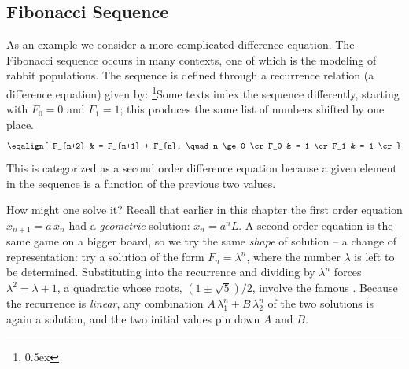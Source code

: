 \subsection{Fibonacci Sequence}
As an example we consider a more complicated difference equation.
The Fibonacci sequence occurs in many contexts, one of which is the modeling of rabbit populations. The
sequence is defined through a recurrence relation (a difference equation) given by:%
\footnote{\kern 0.5pt \raise 0.5ex \hbox{\dag}}{Some texts index the sequence
differently, starting with $F_0 = 0$ and $F_1 = 1$; this produces the same
list of numbers shifted by one place.}
$$
\eqalign{
F_{n+2} & = F_{n+1} + F_{n}, \quad n \ge 0 \cr
F_0 & = 1 \cr
F_1 & = 1 \cr
}
$$
This is categorized as a second order difference equation because a given element in the sequence is a
function of the previous two values.

How might one solve it? Recall that earlier in this chapter the first order
equation $x_{n+1} = a\, x_n$ had a {\it geometric\/} solution: $x_n = a^n L$.
A second order equation is the same game on a bigger board, so we try the
same {\it shape\/} of solution -- a change of representation: try
a solution of the form $F_n = \lambda^n$, where the number $\lambda$ is left
to be determined. Substituting into the recurrence and
dividing by $\lambda^n$ forces $\lambda^2 = \lambda + 1$, a quadratic
whose roots, $(1 \pm \sqrt{5})/2$, involve the famous {\it {}\/}.
Because the recurrence is {\it linear\/}, any combination
$A\,\lambda_1^n + B\,\lambda_2^n$ of the two solutions is again a solution,
and the two initial values pin down $A$ and $B$.


